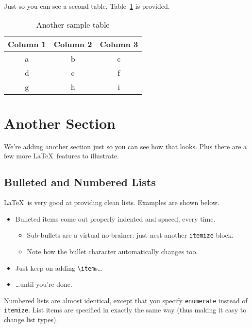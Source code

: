 \documentclass{article}
\begin{document}
Just so you can see a second table, Table~\ref{table-sample2} is provided.

\begin{table}
\centering
\begin{tabular}{|c|c|c|}\hline
Column 1 & Column 2 & Column 3 \\\hline\hline
a & b & c \\
d & e & f \\
g & h & i \\\hline
\end{tabular}

\caption{Another sample table}
\label{table-sample2}
\end{table}

\section{Another Section}

We're adding another section just so you can see how that looks.  Plus there are a few more \LaTeX\ features to illustrate.

\subsection{Bulleted and Numbered Lists}

\LaTeX\ is very good at providing clean lists.  Examples are shown below.

\begin{itemize}
\item Bulleted items come out properly indented and spaced, every time.

\begin{itemize}
\item Sub-bullets are a virtual no-brainer: just nest another \verb!itemize! block.
\item Note how the bullet character automatically changes too.
\end{itemize}

\item Just keep on adding \verb!\item!s\ldots

\item \ldots until you're done.
\end{itemize}

Numbered lists are almost identical, except that you specify \verb!enumerate! instead of \verb!itemize!.  List items are specified in exactly the same way (thus making it easy to change list types).
\end{document}
